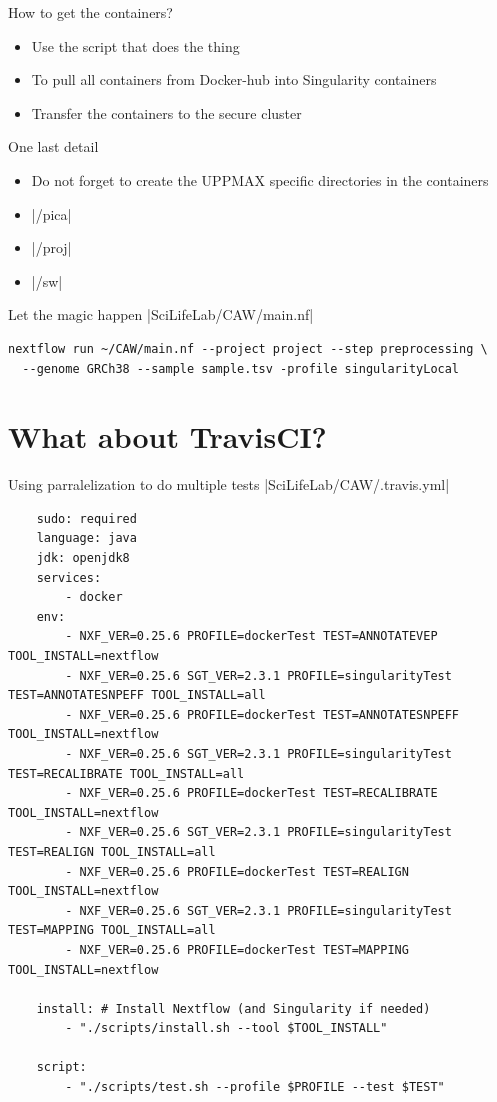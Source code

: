 \documentclass{beamer}
\begin{document}
\begin{frame}{How to get the containers?}
	\begin{itemize}
		\item Use the script that does the thing
		\pause
		\item To pull all containers from Docker-hub into Singularity containers
		\pause
		\item Transfer the containers to the secure cluster
	\end{itemize}
\end{frame}

\begin{frame}{One last detail}
	\begin{itemize}
		\item Do not forget to create the UPPMAX specific directories in the containers
		\pause
		\item {}|/pica|
		\item {}|/proj|
		\item {}|/sw|
	\end{itemize}
\end{frame}

\begin{frame}[fragile]{Let the magic happen}
|SciLifeLab/CAW/main.nf|
\begin{verbatim}
nextflow run ~/CAW/main.nf --project project --step preprocessing \
  --genome GRCh38 --sample sample.tsv -profile singularityLocal
\end{verbatim}
\end{frame}

\section{What about TravisCI?}

\begin{frame}[fragile]{Using parralelization to do multiple tests}
\mint[fontsize=\small]{html}|SciLifeLab/CAW/.travis.yml|
\begin{verbatim}
	sudo: required
	language: java
	jdk: openjdk8
	services:
		- docker
	env:
		- NXF_VER=0.25.6 PROFILE=dockerTest TEST=ANNOTATEVEP TOOL_INSTALL=nextflow
		- NXF_VER=0.25.6 SGT_VER=2.3.1 PROFILE=singularityTest TEST=ANNOTATESNPEFF TOOL_INSTALL=all
		- NXF_VER=0.25.6 PROFILE=dockerTest TEST=ANNOTATESNPEFF TOOL_INSTALL=nextflow
		- NXF_VER=0.25.6 SGT_VER=2.3.1 PROFILE=singularityTest TEST=RECALIBRATE TOOL_INSTALL=all
		- NXF_VER=0.25.6 PROFILE=dockerTest TEST=RECALIBRATE TOOL_INSTALL=nextflow
		- NXF_VER=0.25.6 SGT_VER=2.3.1 PROFILE=singularityTest TEST=REALIGN TOOL_INSTALL=all
		- NXF_VER=0.25.6 PROFILE=dockerTest TEST=REALIGN TOOL_INSTALL=nextflow
		- NXF_VER=0.25.6 SGT_VER=2.3.1 PROFILE=singularityTest TEST=MAPPING TOOL_INSTALL=all
		- NXF_VER=0.25.6 PROFILE=dockerTest TEST=MAPPING TOOL_INSTALL=nextflow

	install: # Install Nextflow (and Singularity if needed)
		- "./scripts/install.sh --tool $TOOL_INSTALL"

	script:
		- "./scripts/test.sh --profile $PROFILE --test $TEST"
\end{verbatim}
\end{frame}
\end{document}
